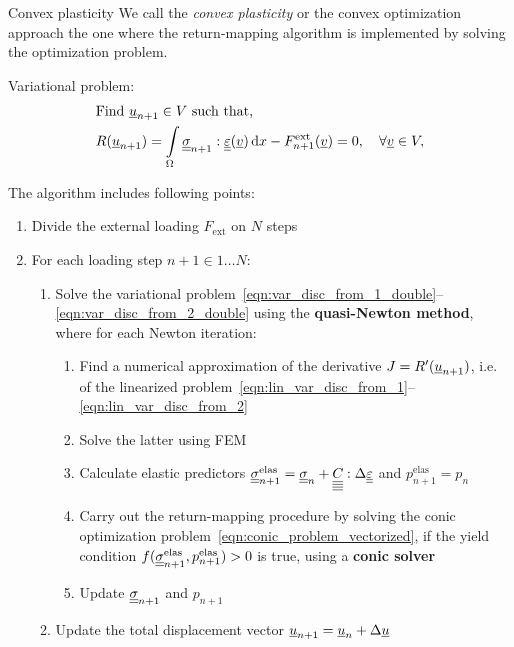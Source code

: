 \documentclass[9pt]{beamer}
\begin{document}
\begin{frame}{Convex plasticity}
  We call the \textit{convex plasticity} or the convex optimization approach the one where the return-mapping algorithm is implemented by solving the optimization problem.
  \newline 

  Variational problem:
  \begin{align}
    & \text{Find } \underline{u}_{n+1} \in V \text{ such that,} \label{eqn:var_disc_from_1_double} \\ 
    & R(\underline{u}_{n+1}) = \int\limits_\Omega\underline{\underline{\sigma}}_{n+1} : \underline{\underline{\varepsilon}}(\underline{v}) \, \mathrm{d} x - F_{n+1}^\text{ext}(\underline{v}) = 0, \quad \forall \underline{v} \in V \label{eqn:var_disc_from_2_double},
  \end{align}

  The algorithm includes following points:
  \begin{enumerate}
    \item Divide the external loading $F_\text{ext}$ on $N$ steps
    \item For each loading step $n+1 \in {1 \dots N}$:
    \begin{enumerate}
        \item Solve the variational problem~\eqref{eqn:var_disc_from_1_double}--\eqref{eqn:var_disc_from_2_double} using the \textbf{quasi-Newton method}, where for each Newton iteration:
        \begin{enumerate}
            \item Find a numerical approximation of the derivative $J = R^\prime(\underline{u}_{n+1})$, i.e. of the linearized problem~\eqref{eqn:lin_var_disc_from_1}--\eqref{eqn:lin_var_disc_from_2}
            \item Solve the latter using FEM
            \item Calculate elastic predictors $\underline{\underline{\sigma}}_{n+1}^{\text{elas}} = \underline{\underline{\sigma}}_n + \underline{\underline{\underline{\underline{C_{}}}}} : \Delta\underline{\underline{\varepsilon}}$ and $p^\text{elas}_{n+1} = p_n$
            \item Carry out the return-mapping procedure by solving the conic optimization problem~\eqref{eqn:conic_problem_vectorized}, if the yield condition $f(\underline{\underline{\sigma}}_{n+1}^{\text{elas}}, p^\text{elas}_{n+1}) > 0$ is true, using a \textbf{conic solver}
            \item Update $\underline{\underline{\sigma}}_{n+1}$ and $p_{n+1}$
        \end{enumerate}
        \item Update the total displacement vector $\underline{u}_{n+1} = \underline{u}_n + \Delta\underline{u}$
    \end{enumerate}
  \end{enumerate}
\end{frame}
\end{document}
